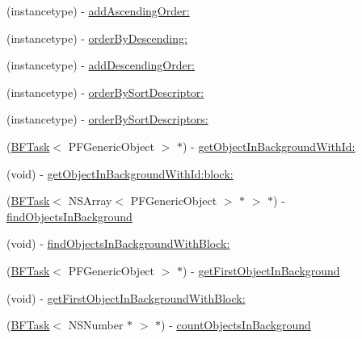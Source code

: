 \begin{DoxyCompactItemize}
\begin{DoxyCompactList}
 \end{DoxyCompactList}\item 
(instancetype) -\/ \hyperlink{class_p_f_query_ae2be0a54cc4421be06d320f4f39e2996}{add\+Ascending\+Order\+:}
\item 
(instancetype) -\/ \hyperlink{class_p_f_query_a013115084380b1fc73b10a578b1e7745}{order\+By\+Descending\+:}
\item 
(instancetype) -\/ \hyperlink{class_p_f_query_a16a4545bd7ca6b86bb59c3d131f55ec9}{add\+Descending\+Order\+:}
\item 
(instancetype) -\/ \hyperlink{class_p_f_query_a06d9f1b916c9787fff90f96f1a15e60f}{order\+By\+Sort\+Descriptor\+:}
\item 
(instancetype) -\/ \hyperlink{class_p_f_query_af7cc54c248ae278c40951da54820c671}{order\+By\+Sort\+Descriptors\+:}
\item 
(\hyperlink{class_b_f_task}{B\+F\+Task}$<$ P\+F\+Generic\+Object $>$ $\ast$) -\/ \hyperlink{class_p_f_query_a9965839384628a8382fb943bd6b84bf4}{get\+Object\+In\+Background\+With\+Id\+:}
\begin{DoxyCompactList}\small\item\em 

 \end{DoxyCompactList}\item 
(void) -\/ \hyperlink{class_p_f_query_a6fde40fe2dbd4b32f98aaf4992f52067}{get\+Object\+In\+Background\+With\+Id\+:block\+:}
\item 
(\hyperlink{class_b_f_task}{B\+F\+Task}$<$ N\+S\+Array$<$ P\+F\+Generic\+Object $>$ $\ast$ $>$ $\ast$) -\/ \hyperlink{class_p_f_query_ab63f430d51ef6799ff828d6053008cd7}{find\+Objects\+In\+Background}
\begin{DoxyCompactList}\small\item\em 

 \end{DoxyCompactList}\item 
(void) -\/ \hyperlink{class_p_f_query_acedca5b8928989cb027cc08e749e674c}{find\+Objects\+In\+Background\+With\+Block\+:}
\item 
(\hyperlink{class_b_f_task}{B\+F\+Task}$<$ P\+F\+Generic\+Object $>$ $\ast$) -\/ \hyperlink{class_p_f_query_a42fd8a18e4cc3ebd96ec2a4dc4a66bea}{get\+First\+Object\+In\+Background}
\begin{DoxyCompactList}\small\item\em 

 \end{DoxyCompactList}\item 
(void) -\/ \hyperlink{class_p_f_query_a13638a06b72c596980990e3fde05fc73}{get\+First\+Object\+In\+Background\+With\+Block\+:}
\item 
(\hyperlink{class_b_f_task}{B\+F\+Task}$<$ N\+S\+Number $\ast$ $>$ $\ast$) -\/ \hyperlink{class_p_f_query_a98ff71bed98232607dbfd8320a47a0f4}{count\+Objects\+In\+Background}
\begin{DoxyCompactList}\small\item\em 


\end{DoxyCompactList}
\end{DoxyCompactItemize}
